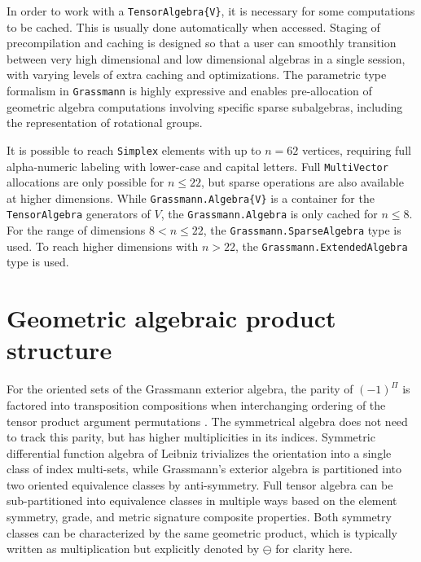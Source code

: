\documentclass{juliacon}
\begin{document}
In order to work with a \verb`TensorAlgebra{V}`, it is necessary for some computations to be cached. This is usually done automatically when accessed.
Staging of precompilation and caching is designed so that a user can smoothly transition between very high dimensional and low dimensional algebras in a single session, with varying levels of extra caching and optimizations.
The parametric type formalism in \verb`Grassmann` is highly expressive and enables pre-allocation of geometric algebra computations involving specific sparse subalgebras, including the representation of rotational groups.

It is possible to reach \verb`Simplex` elements with up to $n=62$ vertices, %
requiring full alpha-numeric labeling with lower-case and capital letters. 
Full \verb`MultiVector` allocations are only possible for $n\leq22$, but sparse operations are also available at higher dimensions.
While \verb`Grassmann.Algebra{V}` is a container for the \verb`TensorAlgebra` generators of $V$, the \verb`Grassmann.Algebra` is only cached for $n\leq8$.
For the range of dimensions $8<n\leq22$, the \verb`Grassmann.SparseAlgebra` type is used.
To reach higher dimensions with $n>22$, the \verb`Grassmann.ExtendedAlgebra` type is used.

\section{Geometric algebraic product structure}

For the oriented sets of the Grassmann exterior algebra, the parity of $(-1)^\Pi$ is factored into transposition compositions when interchanging ordering of the tensor product argument permutations \cite{artin}.
The symmetrical algebra does not need to track this parity, but has higher multiplicities in its indices.
Symmetric differential function algebra of Leibniz trivializes the orientation into a single class of index multi-sets, while Grassmann's exterior algebra is partitioned into two oriented equivalence classes by anti-symmetry.
Full tensor algebra can be sub-partitioned into equivalence classes in multiple ways based on the element symmetry, grade, and metric signature composite properties.
Both symmetry classes can be characterized by the same geometric product, which is typically written as multiplication but explicitly denoted by $\ominus$ for clarity here.
\end{document}
